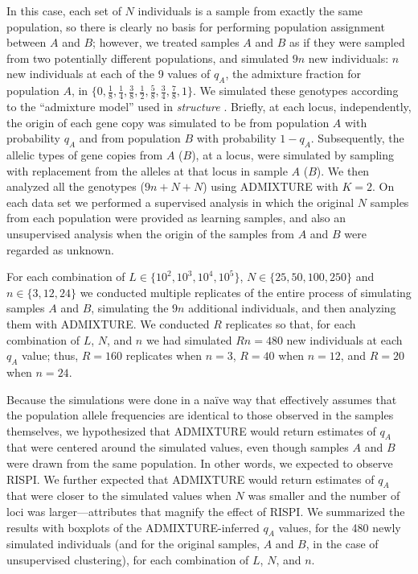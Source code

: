 In this case,
each set of $N$ individuals is a sample from exactly the same population, so
there is clearly no basis for performing population assignment between $A$ and $B$;
however, we treated samples $A$ and $B$ as if they were sampled from two potentially different
populations, and simulated $9n$ new individuals: $n$ new individuals at each of the 9 values of
$q_A$, the admixture fraction for population $A$, in  $\{0, \frac{1}{8}, \frac{1}{4}, \frac{3}{8}, \frac{1}{2}, \frac{5}{8}, \frac{3}{4}, \frac{7}{8}, 1\}$.
We simulated these genotypes according to the ``admixture model'' used in {\em structure} \citep{pritchard2000inference}.  Briefly, at each
locus, independently, the origin
of each gene copy was simulated to be from
population $A$ with probability $q_A$ and from population $B$ with probability $1-q_A$.  Subsequently,
the allelic types of gene copies from $A$ ($B$), at a locus, were simulated by sampling with replacement
from the alleles at that locus in sample $A$ ($B$).
We then analyzed all the genotypes ($9n + N + N$) using ADMIXTURE with $K=2$. On each data set we performed a supervised analysis in which the original
$N$ samples from each
population were provided as learning samples, and also an
unsupervised analysis when the origin of the samples from $A$ and $B$ were regarded as unknown.

For each combination of $L \in \{10^2, 10^3, 10^4, 10^5\}$,
$N \in \{25, 50, 100, 250\}$ and $n\in\{3,12,24\}$ we conducted multiple replicates
of the entire process of
simulating samples $A$ and $B$, simulating the $9n$ additional individuals, and
then analyzing them with ADMIXTURE.  We conducted $R$ replicates so that,
for each combination of $L$, $N$, and $n$ we had simulated $Rn=480$ new individuals
at each $q_A$ value; thus, $R=160$ replicates when $n = 3$, $R=40$ when $n=12$, and
$R=20$ when $n=24$.


Because the simulations were done in a na\"{i}ve way that effectively assumes that the population
allele frequencies are identical to those observed in the samples themselves, we hypothesized that ADMIXTURE would return estimates of
$q_A$ that were
centered around the simulated values, even though samples $A$ and $B$ were drawn from the same
population. In other words, we expected to observe RISPI.
We further expected that ADMIXTURE would return estimates of $q_A$ that were closer
to the simulated values when $N$ was smaller and the number of loci was larger---attributes that magnify the effect of RISPI.
We summarized the results with boxplots of the ADMIXTURE-inferred $q_A$ values,
 for the 480 newly simulated individuals (and for the original samples, $A$ and $B$, in the
 case of unsupervised clustering),
for each combination of $L$, $N$, and $n$.


